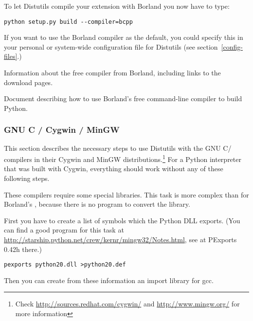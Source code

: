 \documentclass{howto}
\begin{document}
To let Distutils compile your extension with Borland \Cpp{} you now have
to type:

\begin{verbatim}
python setup.py build --compiler=bcpp
\end{verbatim}

If you want to use the Borland \Cpp{} compiler as the default, you
could specify this in your personal or system-wide configuration file
for Distutils (see section~\ref{config-files}.)
 
\begin{seealso}
    {Information about the free \Cpp{} compiler from Borland,
     including links to the download pages.}

    {Document describing how to use Borland's free command-line \Cpp
     compiler to build Python.}
\end{seealso}


\subsubsection{GNU C / Cygwin / MinGW}

This section describes the necessary steps to use Distutils with the
GNU C/\Cpp{} compilers in their Cygwin and MinGW
distributions.\footnote{Check
\url{http://sources.redhat.com/cygwin/} and
\url{http://www.mingw.org/} for more information}
For a Python interpreter that was built with Cygwin, everything should
work without any of these following steps.

These compilers require some special libraries.
This task is more complex than for Borland's \Cpp, because there is no
program to convert the library.
 
First you have to create a list of symbols which the Python DLL exports.
(You can find a good program for this task at 
\url{http://starship.python.net/crew/kernr/mingw32/Notes.html}, see at 
PExports 0.42h there.)

\begin{verbatim}
pexports python20.dll >python20.def
\end{verbatim}

Then you can create from these information an import library for gcc.
 
\end{document}
